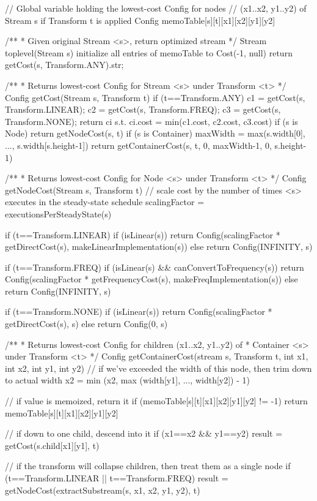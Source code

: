 // Global variable holding the lowest-cost Config for nodes
// (x1..x2, y1..y2) of Stream s if Transform t is applied
Config memoTable[s][t][x1][x2][y1][y2]

/** 
 * Given original Stream <s>, return optimized stream
 */
Stream toplevel(Stream s)
  initialize all entries of memoTable to Cost(-1, null)
  return getCost(s, Transform.ANY).str;

/**
 * Returns lowest-cost Config for Stream <s> under Transform <t>
 */
Config getCost(Stream s, Transform t)
  if (t==Transform.ANY)
    c1 = getCost(s, Transform.LINEAR);
    c2 = getCost(s, Transform.FREQ);
    c3 = getCost(s, Transform.NONE);
    return ci s.t. ci.cost = min(c1.cost, c2.cost, c3.cost)
  if (s is Node)
    return getNodeCost(s, t)
  if (s is Container)
    maxWidth = max(s.width[0], ..., s.width[s.height-1])
    return getContainerCost(s, t, 0, maxWidth-1, 0, s.height-1)

/**
 * Returns lowest-cost Config for Node <s> under Transform <t>
 */ 
Config getNodeCost(Stream s, Transform t)
  // scale cost by the number of times <s> executes in the steady-state schedule
  scalingFactor = executionsPerSteadyState(s)

  if (t==Transform.LINEAR)
    if (isLinear(s))
      return Config(scalingFactor * getDirectCost(s), makeLinearImplementation(s))
    else
      return Config(INFINITY, s)

  if (t==Transform.FREQ)
    if (isLinear(s) && canConvertToFrequency(s))
      return Config(scalingFactor * getFrequencyCost(s), makeFreqImplementation(s))
    else 
      return Config(INFINITY, s)

  if (t==Transform.NONE)
    if (isLinear(s))
      return Config(scalingFactor * getDirectCost(s), s)
    else
      return Config(0, s)

/** 
 * Returns lowest-cost Config for children (x1..x2, y1..y2) of
 * Container <s> under Transform <t>
 */
Config getContainerCost(stream s, Transform t, int x1, int x2, int y1, int y2)
  // if we've exceeded the width of this node, then trim down to actual width
  x2 = min (x2, max (width[y1], ..., width[y2]) - 1)

  // if value is memoized, return it
  if (memoTable[s][t][x1][x2][y1][y2] != -1)
    return memoTable[s][t][x1][x2][y1][y2]

  // if down to one child, descend into it
  if (x1==x2 && y1==y2)
    result = getCost(s.child[x1][y1], t)

  // if the transform will collapse children, then treat them as a single node
  if (t==Transform.LINEAR || t==Transform.FREQ)
    result = getNodeCost(extractSubstream(s, x1, x2, y1, y2), t)

